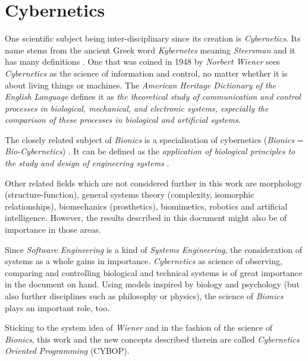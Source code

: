 %
%
%
%
%
%
%

\section{Cybernetics}
\label{cybernetics_heading}

One scientific subject being inter-disciplinary since its creation is
\emph{Cybernetics}. Its name stems from the ancient Greek word \emph{Kybernetes}
meaning \emph{Steersman} and it has many definitions \cite{heylighen}. One that
was coined in 1948 by \emph{Norbert Wiener} sees \emph{Cybernetics} as the
science of information and control, no matter whether it is about living things
or machines. The \emph{American Heritage Dictionary of the English Language}
\cite{americanheritagedictionary} defines it as \textit{the theoretical study
of communication and control processes in biological, mechanical, and electronic
systems, especially the comparison of these processes in biological and
artificial systems}.

The closely related subject of \emph{Bionics} is a specialisation of cybernetics
(\emph{Bionics} = \emph{Bio-Cybernetics}) \cite{designmatrix}. It can be defined
as the \textit{application of biological principles to the study and design of
engineering systems} \cite{americanheritagedictionary}.

Other related fields which are not considered further in this work are morphology
(structure-function), general systems theory (complexity, isomorphic relationships),
biomechanics (prosthetics), biomimetics, robotics and artificial intelligence.
However, the results described in this document might also be of importance in
those areas.

Since \emph{Software Engineering} is a kind of \emph{Systems Engineering}, the
consideration of systems as a whole gains in importance. \emph{Cybernetics} as
science of observing, comparing and controlling biological and technical systems
is of great importance in the document on hand. Using models inspired by biology
and psychology (but also further disciplines such as philosophy or physics), the
science of \emph{Bionics} plays an important role, too.

Sticking to the system idea of \emph{Wiener} and in the fashion of the science
of \emph{Bionics}, this work and the new concepts described therein are called
\emph{Cybernetics Oriented Programming} (CYBOP).
